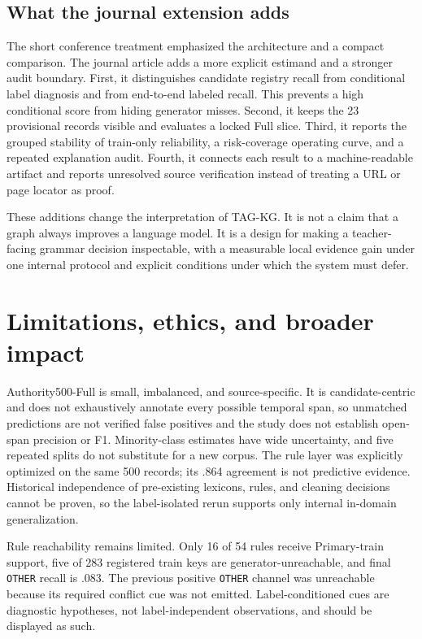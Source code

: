 \documentclass{CUP-JNL-NLP}
\begin{document}
\subsection{What the journal extension adds}
The short conference treatment emphasized the architecture and a compact comparison. The journal article adds a more explicit estimand and a stronger audit boundary. First, it distinguishes candidate registry recall from conditional label diagnosis and from end-to-end labeled recall. This prevents a high conditional score from hiding generator misses. Second, it keeps the 23 provisional records visible and evaluates a locked Full slice. Third, it reports the grouped stability of train-only reliability, a risk-coverage operating curve, and a repeated explanation audit. Fourth, it connects each result to a machine-readable artifact and reports unresolved source verification instead of treating a URL or page locator as proof.

These additions change the interpretation of TAG-KG. It is not a claim that a graph always improves a language model. It is a design for making a teacher-facing grammar decision inspectable, with a measurable local evidence gain under one internal protocol and explicit conditions under which the system must defer.

\section{Limitations, ethics, and broader impact}
Authority500-Full is small, imbalanced, and source-specific. It is candidate-centric and does not exhaustively annotate every possible temporal span, so unmatched predictions are not verified false positives and the study does not establish open-span precision or F1. Minority-class estimates have wide uncertainty, and five repeated splits do not substitute for a new corpus. The rule layer was explicitly optimized on the same 500 records; its .864 agreement is not predictive evidence. Historical independence of pre-existing lexicons, rules, and cleaning decisions cannot be proven, so the label-isolated rerun supports only internal in-domain generalization.

Rule reachability remains limited. Only 16 of 54 rules receive Primary-train support, five of 283 registered train keys are generator-unreachable, and final \texttt{OTHER} recall is .083. The previous positive \texttt{OTHER} channel was unreachable because its required conflict cue was not emitted. Label-conditioned cues are diagnostic hypotheses, not label-independent observations, and should be displayed as such.
\end{document}
